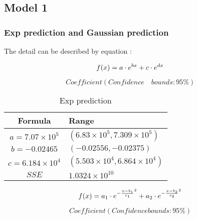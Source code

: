 \documentclass[12pt]{article}  %
\begin{document}
\subsection{Model 1}
\subsubsection{Exp prediction and Gaussian prediction}
The detail can be described by equation :

\begin{equation}
\large f(x)=a\cdot  e^{bx}+c\cdot e^{dx}
\end{equation}

$$Coefficient(Confidence \quad bounds: 95\%)$$
\begin{table}[!htbp]
	\begin{center}
		\caption{Exp prediction}
		\begin{tabular}{cl}
			\toprule
			\multicolumn{1}{m{3cm}}{\centering Formula}
			&\multicolumn{1}{m{8cm}}{\centering Range}\\
			\midrule
			$ a=7.07\times 10^{5}$ &   \qquad\qquad $(6.83\times 10^{5}, 7.309\times10^{5})$\\
			$ b=-0.02465 $ &   \qquad\qquad $(-0.02556, -0.02375)$\\
			$ c=6.184\times 10^{4}$ &  \qquad\qquad  $(5.503\times 10^{4}, 6.864\times 10^{4})$\\
			$ SSE$ &  \qquad\qquad  $1.0324\times 10^{10}$\\
			\bottomrule
		\end{tabular}\label{tb:notation}
	\end{center}
\end{table}

\begin{equation}
\large f(x) =  a_1\cdot e^{-\frac{x-b_1}{c_1}^2} + a_2\cdot e^{-\frac{x-b_2}{c_2}^2}
\end{equation}

$$Coefficient(Confidence bounds: 95\%)$$
\end{document}

